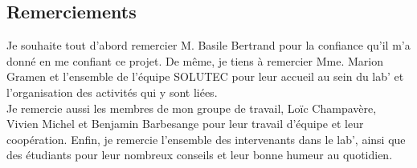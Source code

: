 \documentclass[a4paper, 11pt]{report}
\begin{document}
\begin{spacing}{1.2} %

\newpage
{}
\section*{Remerciements}
 Je souhaite tout d'abord remercier M. Basile Bertrand pour la confiance qu'il m'a donné en me confiant ce projet. De même, je tiens à remercier Mme. Marion Gramen et l'ensemble de l'équipe SOLUTEC pour leur accueil au sein du lab' et l'organisation des activités qui y sont liées.\\
 Je remercie aussi les membres de mon groupe de travail, Loïc Champavère, Vivien Michel et Benjamin Barbesange pour leur travail d'équipe et leur coopération.
 Enfin, je remercie l'ensemble des intervenants dans le lab', ainsi que des étudiants pour leur nombreux conseils et leur bonne humeur au quotidien. 

\newpage
\tableofcontents %
\newpage
\listoffigures












\end{spacing}
\end{document}
